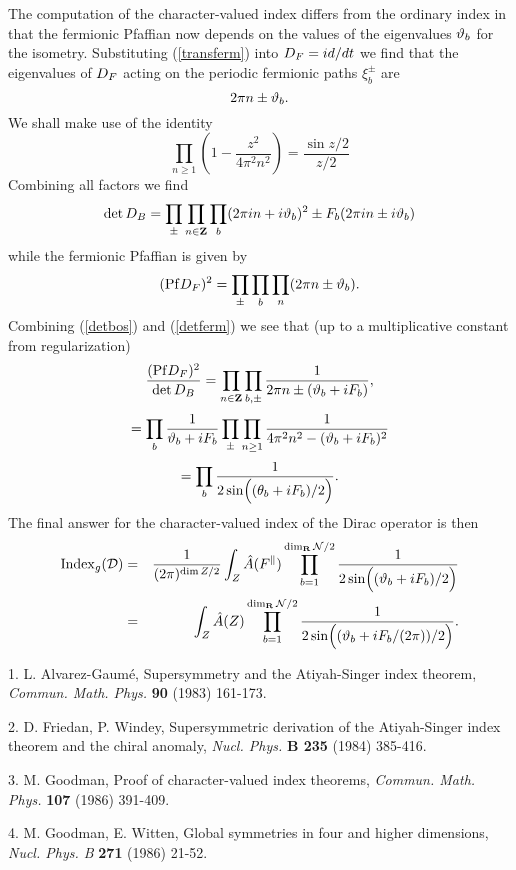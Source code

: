 \documentclass[12pt]{article}
\newcommand{\labell}[1] {\label{#1}}
\begin{document}
The computation of the character-valued index differs from the ordinary
index in that the fermionic Pfaffian now depends on the values
of the eigenvalues $\vartheta_b$ for the isometry.
Substituting  (\ref{transferm}) into ${D_F} = id/dt$ we find
that the eigenvalues of ${D_F}$ acting on  the 
periodic fermionic   paths
$\xi^\pm_b$ are
$$ 2 \pi  n \pm  \vartheta_b.$$
We shall make use of the identity
\begin{equation} \label{fundid}
\prod_{n \ge 1} (1 - \frac{z^2}{4 \pi^2 n^2} ) = 
\frac{\sin z/2 }{z/2} 
\end{equation} 
Combining all factors we find
\begin{equation} \labell{detbos}
\det \opbose = \prod_{\pm} \prod_{n  \in \ZZ } \prod_b 
(2 \pi in + i\eig_b)^2 \pm {F_b }(2 \pi in \pm i\eig_b) 
\end{equation}
while the fermionic Pfaffian is given by 
\begin{equation} \labell{detferm}
({\rm Pf} \opferm)^2 = \prod_{\pm} \prod_b \prod_n 
(2 \pi n \pm \eig_b). 
\end{equation}
Combining (\ref{detbos}) and (\ref{detferm}) we see that
(up to a multiplicative constant from regularization)
\begin{equation} \labell{detcomb}
\frac{({\rm Pf} \opferm)^2}{\det \opbose} = 
\prod_{n \in \ZZ} \prod_{b, \pm} \frac{1}{ 2 \pi n \pm (\eig_b + iF_b)},
\end{equation}
$$ = 
\prod_{b} \frac{1}{\vartheta_b + i F_b} \prod_{\pm} \prod_{n \ge 1} 
\frac{1}{4 \pi^2 n^2 - (\vartheta_b + i F_b)^2 } $$
$$ = \prod_b \frac{1}{2 \sin \Bigl (  (\theta_b + i F_b)/2\Bigr ) }. $$
The final answer for the character-valued index of the Dirac operator 
is then 
\begin{eqnarray} \label{finans}
{\rm Index}_g({ \cal D})&=&
\frac{1}{(2\pi)^{\dim Z/2}}\int_Z \hat{A} (F^\parallel) 
\prod_{b= 1}^{\dim_{{\mathbf{R}}} {\cal N}/2}
\frac{1} {2 \sin \Bigl ( (\vartheta_b + i F_b)/2\Bigr ) }	\nonumber \\
&=& \int_Z \hat{A} (Z) 
\prod_{b= 1}^{\dim_{{\mathbf{R}}} {\cal N}/2}
\frac{1} {2 \sin \Bigl ( (\vartheta_b + i F_b/(2\pi))/2\Bigr ) }.
\end{eqnarray}






 





1. L. Alvarez-Gaum\'e, Supersymmetry and the Atiyah-Singer
index theorem, \emph{Commun. Math. Phys.} \textbf{90} (1983) 161-173.

2. D. Friedan, P. Windey, Supersymmetric
derivation of the Atiyah-Singer index
theorem and the chiral anomaly, \emph{Nucl. Phys.} {\bf B 235} (1984) 385-416.

3. M. Goodman, Proof of character-valued index theorems,
\emph{Commun. Math. Phys.} \textbf{107} (1986) 391-409.

4. M. Goodman, E. Witten, Global symmetries in four and higher
dimensions, \emph{Nucl. Phys. B} \textbf{271} (1986) 21-52.
\end{document}
